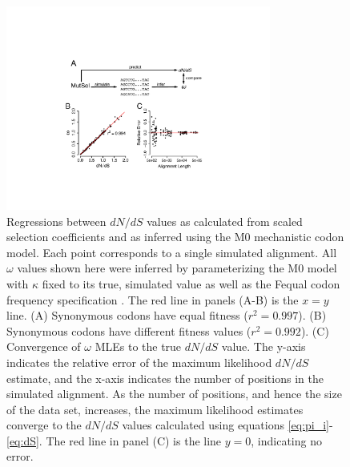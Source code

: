 \documentclass{pnastwo}
\begin{document}
		
\vspace{2cm}
		
\begin{figure}[htbp]
	\centerline{\includegraphics[width=8.7cm]{figures/MainText/regression_convergence.pdf}}
	\caption{\label{reg_conv} Regressions between $dN/dS$ values as calculated from scaled selection coefficients and as inferred using the M0 mechanistic codon model. Each point corresponds to a single simulated alignment. All $\omega$ values shown here were inferred by parameterizing the M0 model with $\kappa$ fixed to its true, simulated value as well as the Fequal codon frequency specification \cite{Yang2006}. The red line in panels (A-B) is the $x=y$ line. (A) Synonymous codons have equal fitness ($r^2=0.997$). (B) Synonymous codons have different fitness values ($r^2=0.992$). (C) Convergence of $\omega$ MLEs to the true $dN/dS$ value. The y-axis indicates the relative error of the maximum likelihood $dN/dS$ estimate, and the x-axis indicates the number of positions in the simulated alignment. As the number of positions, and hence the size of the data set, increases, the maximum likelihood estimates converge to the $dN/dS$ values calculated using equations \eqref{eq:pi_i}-\eqref{eq:dS}. The red line in panel (C) is the line $y=0$, indicating no error.}
\end{figure}
	
\vspace{2cm}
	
\end{document}
